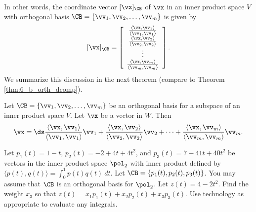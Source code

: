 In other words, the coordinate vector $[\vx]_{\CB}$ of $\vx$ in an inner product space $V$ with orthogonal basis $\CB = \{\vv_1, \vv_2, \ldots, \vv_m\}$ is given by 
\[[\vx]_{\CB} = \left[ \begin{array}{c} \frac{\langle \vx, \vv_1 \rangle}{\langle \vv_1, \vv_1 \rangle} \\ \frac{\langle \vx, \vv_2 \rangle}{\langle \vv_2, \vv_2 \rangle} \\ \vdots \\ \frac{\langle \vx, \vv_m \rangle}{\langle \vv_m, \vv_m \rangle} \end{array} \right].\]
We summarize this discussion in the next theorem (compare to Theorem \ref{thm:6_b_orth_dcomp}).

\begin{theorem} \label{thm:6_c_orth_dcomp} Let $\CB = \{\vv_1, \vv_2, \ldots, \vv_m\}$ be an orthogonal basis for a subspace of an inner product space $V$. Let $\vx$ be a vector in $W$. Then
\begin{equation}
\vx = \ds \frac{\langle \vx, \vv_1 \rangle}{\langle \vv_1, \vv_1 \rangle} \vv_1 +  \frac{\langle \vx, \vv_2 \rangle}{\langle \vv_2, \vv_2 \rangle} \vv_2 + \cdots + \frac{\langle \vx, \vv_m \rangle}{\langle \vv_m, \vv_m \rangle} \vv_m. \label{eq:6_c_orth_decomp_ips}
\end{equation}
\end{theorem}



\begin{activity} Let $p_1(t) = 1-t$, $p_2(t) = -2+4t+4t^2$, and $p_3(t) = 7-41t+40t^2$ be vectors in the inner product space $\pol_2$ with inner product defined by $\langle p(t), q(t) \rangle = \int_0^1 p(t)q(t) \ dt$. Let $\CB = \{p_1(t), p_2(t), p_3(t)\}$. You may assume that $\CB$ is an orthogonal basis for $\pol_2$. Let $z(t) = 4-2t^2$. Find the weight $x_3$ so that $z(t) = x_1p_1(t) + x_2 p_2(t) + x_3 p_3(t)$. Use technology as appropriate to evaluate any integrals. 



\end{activity}


